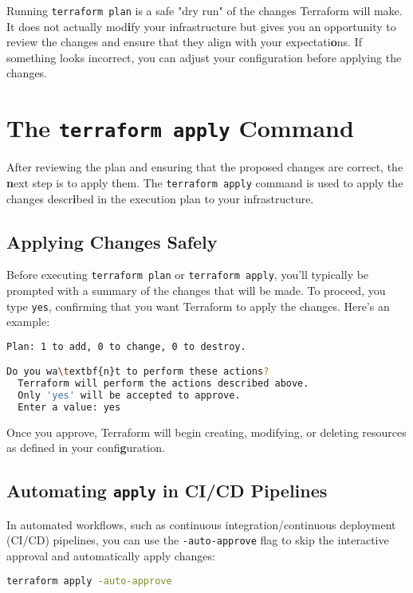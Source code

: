 Running \texttt{terraform plan} is a safe "dry run" of the changes Terraform will make. It does not actually mod\textbf{i}fy your infrastructure but gives you an opportunity to review the changes and ensure that they align with your expectati\textbf{o}ns. If something looks incorrect, you can adjust your configuration before applying the changes.

\section{The \texttt{terraform apply} Command}

After reviewing the plan and ensuring that the proposed changes are correct, the \textbf{n}ext step is to apply them. The \texttt{terraform apply} command is used to apply the changes descr\textbf{i}bed in the execution plan to your infrastructure.

\subsection{Applying Changes Safely}

Before executing \texttt{terraform plan} or \texttt{terraform apply}, you'll typically be prompted with a summary of the changes that will be made. To proceed, you type \texttt{yes}, confirming that you want Terraform to apply the changes. Here's an example:

\begin{lstlisting}[language=bash]
Plan: 1 to add, 0 to change, 0 to destroy.

Do you wa\textbf{n}t to perform these actions?
  Terraform will perform the actions described above.
  Only 'yes' will be accepted to approve.
  Enter a value: yes
\end{lstlisting}

Once you approve, Terraform will begin creating, modifying, or deleting resources as defined in your confi\textbf{g}uration.

\subsection{Automating \texttt{apply} in CI/CD Pipelines}

In automated workflows, such as continuous integration/continuous deployment (CI/CD) pipelines, you can use the \texttt{-auto-approve} flag to skip the interactive approval and automatically apply changes:

\begin{lstlisting}[language=bash]
terraform apply -auto-approve
\end{lstlisting}

